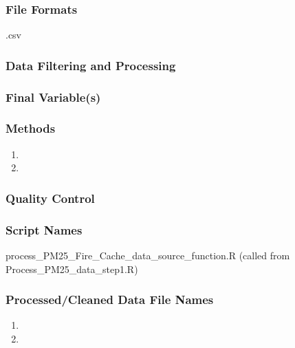 
\subsubsection*{File Formats}
.csv

\subsubsection*{Data Filtering and Processing}

\subsubsection*{Final Variable(s)}

\subsubsection*{Methods}

\begin{enumerate}[nolistsep]
\item
\item
\end{enumerate}

\subsubsection*{Quality Control}

\subsubsection*{Script Names}

process\_PM25\_Fire\_Cache\_data\_source\_function.R (called from Process\_PM25\_data\_step1.R)

\subsubsection*{Processed/Cleaned Data File Names}

\begin{enumerate}[nolistsep]
\item
\item
\end{enumerate}

